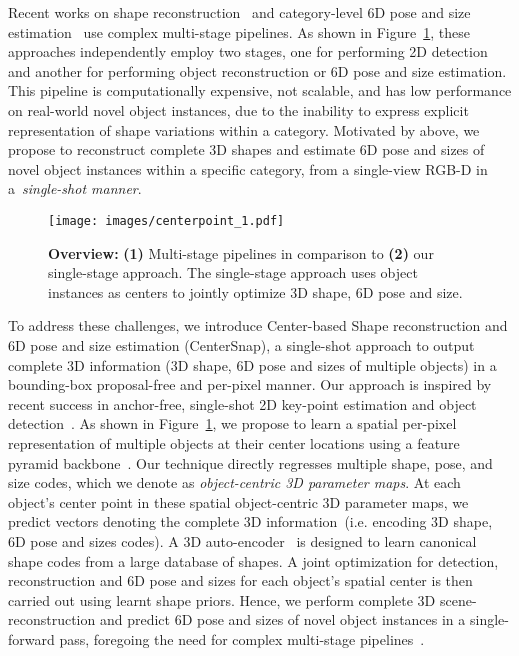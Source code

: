 \documentclass[letter, 10pt, conference]{ieeeconf}
\begin{document}
Recent works on shape reconstruction~\cite{gkioxari2019mesh, kato2018neural} and category-level 6D pose and size estimation~\cite{tian2020shape, wang2019normalized, sundermeyer2020augmented} use complex multi-stage pipelines. As shown in Figure~\ref{ceterpoint_comparison}, these approaches independently employ two stages, one for performing 2D detection~\cite{girshick14CVPR, he2017mask, ren2015faster} and another for performing object reconstruction or 6D pose and size estimation. This pipeline is computationally expensive, not scalable, and has low performance on real-world novel object instances, due to the inability to express explicit representation of shape variations within a category. Motivated by above, we propose to reconstruct complete 3D shapes and estimate 6D pose and sizes of novel object instances within a specific category, from a single-view RGB-D in a~\textit{single-shot manner}.\\
\begin{figure}[t!]
\centering
\texttt{[image: images/centerpoint\_1.pdf]}
\centering
  \caption{
  \textbf{Overview:}
    \textbf{(1)} Multi-stage pipelines in comparison to \textbf{(2)} our single-stage approach. The single-stage approach uses object instances as centers to jointly optimize 3D shape, 6D pose and size.
  }
  \label{ceterpoint_comparison}
\end{figure}
To address these challenges, we introduce Center-based Shape reconstruction and 6D pose and size estimation (CenterSnap), a single-shot approach to output complete 3D information (3D shape, 6D pose and sizes of multiple objects) in a bounding-box proposal-free and per-pixel manner. Our approach is inspired by recent success in anchor-free, single-shot 2D key-point estimation and object detection~\cite{nie2019single, zhou2019objects, zhou2020tracking, duan2019centernet}. As shown in Figure~\ref{ceterpoint_comparison}, we propose to learn a spatial per-pixel representation of multiple objects at their center locations using a feature pyramid backbone~\cite{laskey2021simnet, girshick14CVPR}. Our technique directly regresses multiple shape, pose, and size codes, which we denote as \textit{object-centric 3D parameter maps}. At each object's center point in these spatial object-centric 3D parameter maps, we predict vectors denoting the complete 3D information~(i.e. encoding 3D shape, 6D pose and sizes codes). 
A 3D auto-encoder~\cite{fan2017point, park2019deepsdf} is designed to learn canonical shape codes from a large database of shapes. A joint optimization for detection, reconstruction and 6D pose and sizes for each object's spatial center is then carried out using learnt shape priors. Hence, we perform complete 3D scene-reconstruction and predict 6D pose and sizes of novel object instances in a single-forward pass, foregoing the need for complex multi-stage pipelines~\cite{girshick14CVPR, gkioxari2019mesh, wang2019normalized}.
\end{document}
